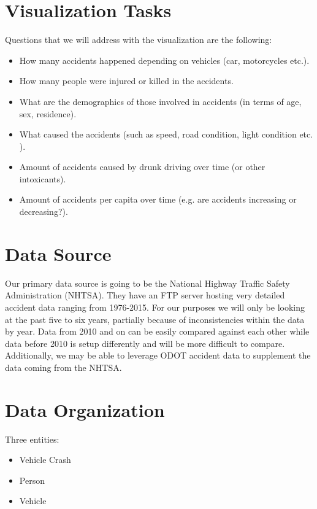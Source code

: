 \documentclass[journal]{vgtc}                %
\begin{document}
\section{Visualization Tasks}

Questions that we will address with the visualization are the following:
\begin{itemize}
\item How many accidents happened depending on vehicles (car, motorcycles etc.).
\item How many people were injured or killed in the accidents.
\item What are the demographics of those involved in accidents (in terms of age, sex, residence).
\item What caused the accidents (such as speed, road condition, light condition etc. ).
\item Amount of accidents caused by drunk driving over time (or other intoxicants).
\item Amount of accidents per capita over time (e.g. are accidents increasing or decreasing?).
\end{itemize}

\section{Data Source}

Our primary data source is going to be the National Highway Traffic Safety Administration (NHTSA). 
They have an FTP server hosting very detailed accident data ranging from 1976-2015. 
For our purposes we will only be looking at the past five to six years, partially because of inconsistencies within the data by year. 
Data from 2010 and on can be easily compared against each other while data before 2010 is setup differently and will be more difficult to compare. 
Additionally, we may be able to leverage ODOT accident data to supplement the data coming from the NHTSA.

\section{Data Organization}

Three entities:
\begin{itemize}
  \item Vehicle Crash
  \item Person 
  \item Vehicle
\end{itemize}
\end{document}
